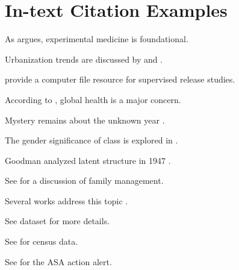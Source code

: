 \documentclass{article}
\begin{document}
\nocite{*} %


\section*{In-text Citation Examples}

As \textcite{bernard1957} argues, experimental medicine is foundational.

Urbanization trends are discussed by \textcite{lee2021a} and \textcite{lee2021b}.

\textcite{deschenes2000} provide a computer file resource for supervised release studies.

According to \textcite{who2022}, global health is a major concern.

Mystery remains about the unknown year \parencite{doe_nodate}.

The gender significance of class is explored in \textcite{szelenyiForthcoming}.

Goodman analyzed latent structure in 1947 \parencite{goodman1947a, goodman1947b}.

See \parencite[pp.~63--93]{sampson1992} for a discussion of family management.

Several works address this topic \parencite{brown2022,kao2003,smith2020a}.

See dataset \textcite{charles1990} for more details.

See \textcite{usbc1960} for census data.

See \textcite{asa1997} for the ASA action alert.


\printbibliography[title={REFERENCES}]
\end{document}
